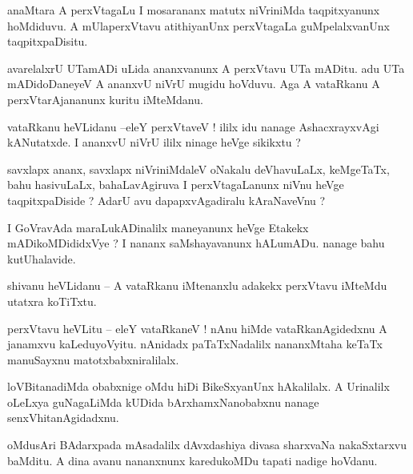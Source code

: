 \documentclass{article}
\begin{document}
\begin{mn}%
anaMtara A perxVtagaLu I mosarananx matutx niVriniMda taqpitxyanunx hoMdiduvu. A mUlaperxVtavu 
atithiyanUnx perxVtagaLa guMpelalxvanUnx taqpitxpaDisitu.
\end{mn}

\begin{mn}%
avarelalxrU UTamADi uLida ananxvanunx A perxVtavu UTa mADitu. adu UTa mADidoDaneyeV A ananxvU niVrU 
mugidu hoVduvu. Aga A vataRkanu A perxVtarAjananunx kuritu iMteMdanu.
\end{mn}

\begin{mn}%
vataRkanu heVLidanu --eleY perxVtaveV ! ililx idu nanage AshacxrayxvAgi kANutatxde. I ananxvU niVrU 
ililx ninage heVge sikikxtu ?
\end{mn}

\begin{mn}%
savxlapx ananx, savxlapx niVriniMdaleV oNakalu deVhavuLaLx, keMgeTaTx, bahu hasivuLaLx, 
bahaLavAgiruva I perxVtagaLanunx niVnu heVge taqpitxpaDiside ? AdarU avu dapapxvAgadiralu 
kAraNaveVnu ?
\end{mn}

\begin{mn}%
I GoVravAda maraLukADinalilx maneyanunx heVge Etakekx mADikoMDididxVye ? I nananx saMshayavanunx 
hALumADu. nanage bahu kutUhalavide.
\end{mn}

\begin{mn}%
shivanu heVLidanu -- A vataRkanu iMtenanxlu adakekx perxVtavu iMteMdu utatxra koTiTxtu.
\end{mn}

\begin{mn}%
perxVtavu heVLitu -- eleY vataRkaneV ! nAnu hiMde vataRkanAgidedxnu A janamxvu kaLeduyoVyitu. 
nAnidadx paTaTxNadalilx nananxMtaha keTaTx manuSayxnu matotxbabxniralilalx.
\end{mn}

\begin{mn}%
loVBitanadiMda obabxnige oMdu hiDi BikeSxyanUnx hAkalilalx. A Urinalilx oLeLxya guNagaLiMda kUDida 
bArxhamxNanobabxnu nanage senxVhitanAgidadxnu.
\end{mn}

\begin{mn}%
oMdusAri BAdarxpada mAsadalilx dAvxdashiya divasa sharxvaNa nakaSxtarxvu baMditu. A dina avanu 
nananxnunx karedukoMDu tapati nadige hoVdanu.
\end{mn}
\end{document}
